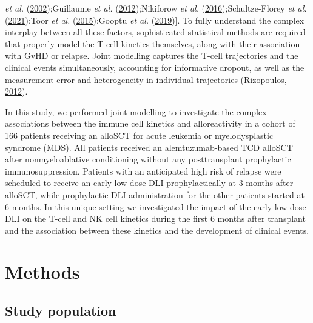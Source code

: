 \documentclass[
  letterpaper,
  DIV=11,
  numbers=noendperiod]{scrreprt}
\begin{document}
\emph{et al.}
(\protect\hyperlink{ref-bellucciImmunologicEffectsProphylactic2002}{2002});Guillaume
\emph{et al.}
(\protect\hyperlink{ref-guillaumeEscalatedLymphodepletionFollowed2012}{2012});Nikiforow
\emph{et al.}
(\protect\hyperlink{ref-nikiforowPhaseStudyCD252016}{2016});Schultze-Florey
\emph{et al.}
(\protect\hyperlink{ref-schultze-floreyClonalExpansionCD82021}{2021});Toor
\emph{et al.}
(\protect\hyperlink{ref-toorDynamicalSystemModeling2015}{2015});Gooptu
\emph{et al.}
(\protect\hyperlink{ref-gooptuEffectSirolimusImmune2019}{2019}){]}. To
fully understand the complex interplay between all these factors,
sophisticated statistical methods are required that properly model the
T-cell kinetics themselves, along with their association with GvHD or
relapse. Joint modelling captures the T-cell trajectories and the
clinical events simultaneously, accounting for informative dropout, as
well as the measurement error and heterogeneity in individual
trajectories
(\protect\hyperlink{ref-rizopoulosJointModelsLongitudinal2012}{Rizopoulos,
2012}).

In this study, we performed joint modelling to investigate the complex
associations between the immune cell kinetics and alloreactivity in a
cohort of 166 patients receiving an alloSCT for acute leukemia or
myelodysplastic syndrome (MDS). All patients received an
alemtuzumab-based TCD alloSCT after nonmyeloablative conditioning
without any posttransplant prophylactic immunosuppression. Patients with
an anticipated high risk of relapse were scheduled to receive an early
low-dose DLI prophylactically at 3 months after alloSCT, while
prophylactic DLI administration for the other patients started at 6
months. In this unique setting we investigated the impact of the early
low-dose DLI on the T-cell and NK cell kinetics during the first 6
months after transplant and the association between these kinetics and
the development of clinical events.

\hypertarget{methods-2}{%
\section{Methods}\label{methods-2}}

\hypertarget{study-population}{%
\subsection{Study population}\label{study-population}}
\end{document}
